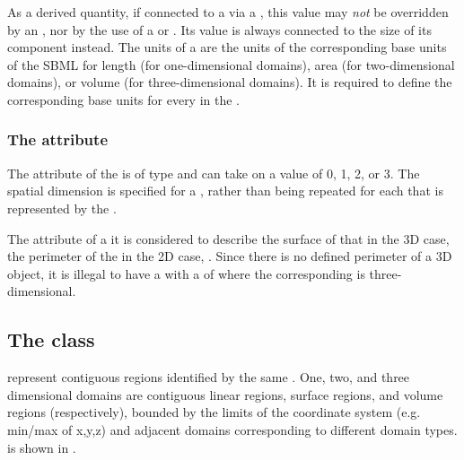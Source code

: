 As a derived quantity, if connected to a \Parameter via a \SpatialSymbolReference, this value may \emph{not} be overridden by an \InitialAssignment, nor by the use of a \Rule or \Event.  Its value is always connected to the size of its component \Domains instead.  The units of a \DomainType are the units of the corresponding base units of the SBML \Model for length (for one-dimensional domains), area (for two-dimensional domains), or volume (for three-dimensional domains).  It is required to define the corresponding base units for every \DomainType in the \Model.

\subsubsection{The \fixttspace{} attribute}
The  attribute of the \DomainType is of type  and can take on a value of 0, 1, 2, or 3. The spatial dimension is specified for a \DomainType, rather than being repeated for each \Domain that is represented by the \DomainType.

The  attribute of a \DomainType {} it is considered to describe the surface of that \Geometry in the 3D case, the perimeter of the \Geometry in the 2D case, .  Since there is no defined perimeter of a 3D object, it is illegal to have a \DomainType with a  of  where the corresponding \Geometry is three-dimensional.  


\subsection{The  class}
\label{domain-class}
\label{listofinteriorpoints-class}
\Domains represent contiguous regions identified by the same \DomainType.  One, two, and three dimensional domains are contiguous linear regions, surface regions, and volume regions (respectively), bounded by the limits of the coordinate system (e.g. min/max of x,y,z) and adjacent domains corresponding to different domain types.  \Domain is shown in .
 
